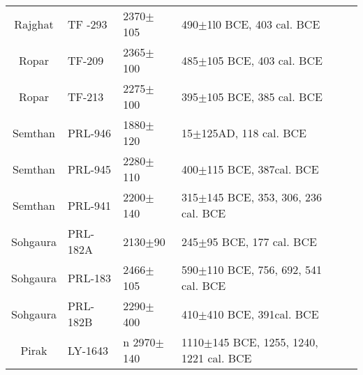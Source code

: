 {{\begin{longtable}{|c|p{1.1cm}|p{1.2cm}|p{1.8cm}|p{3.3cm}|}
Rajghat & TF -293 & 2370$\pm$105 & 490$\pm$1l0 BCE, 403 cal. BCE & \\
Ropar & TF-209 & 2365$\pm$100 & 485$\pm$105 BCE, 403 cal. BCE & \\
Ropar & TF-213 & 2275$\pm$100 & 395$\pm$105 BCE, 385 cal. BCE & \\
Semthan & PRL-946 & 1880$\pm$120 &15$\pm$125AD, 118 cal. BCE &\\
Semthan & PRL-945 & 2280$\pm$110 & 400$\pm$115 BCE, 387cal. BCE & \\
Semthan & PRL-941 & 2200$\pm$140 & 315$\pm$145 BCE, 353, 306, 236 cal. BCE &\\
Sohgaura & PRL-182A & 2130$\pm$90 & 245$\pm$95 BCE, 177 cal. BCE & \\
Sohgaura & PRL-183 & 2466$\pm$105 & 590$\pm$110 BCE, 756, 692, 541 cal. BCE &\\
Sohgaura & PRL-182B & 2290$\pm$400 & 410$\pm$410 BCE, 391cal. BCE &\\
Pirak & LY-1643 &n 2970$\pm$140 & 1110$\pm$145 BCE, 1255, 1240, 1221 cal. BCE&\\
\hline
\end{longtable}
}}

